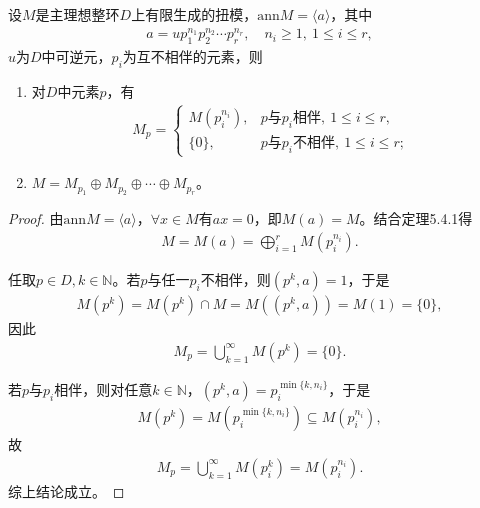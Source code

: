 \documentclass[../../main.tex]{subfiles}%
\begin{document}
\begin{theorem}
设$M$是主理想整环$D$上有限生成的扭模，$\mathrm{ann}M=\langle a\rangle$，其中
\begin{align*}
a=up_1^{n_1}p_2^{n_2}\cdots p_r^{n_r},\quad n_i\geqslant1,\ 1\leqslant i\leqslant r,
\end{align*}
$u$为$D$中可逆元，$p_i$为互不相伴的元素，则
\begin{enumerate}[(1)]
\item 对$D$中元素$p$，有
\begin{align*}
M_p=
\begin{cases}
M(p_i^{n_i}),& p\text{与}p_i\text{相伴},\ 1\leqslant i\leqslant r,\\
\{0\},& p\text{与}p_i\text{不相伴},\ 1\leqslant i\leqslant r;
\end{cases}
\end{align*}
\item $M=M_{p_1}\oplus M_{p_2}\oplus\cdots\oplus M_{p_r}$。
\end{enumerate}
\end{theorem}
\begin{proof}
由$\mathrm{ann}M=\langle a\rangle$，$\forall x\in M$有$ax=0$，即$M(a)=M$。结合定理5.4.1得
\begin{align*}
M=M(a)=\bigoplus\limits_{i=1}^{r}M(p_i^{n_i}).
\end{align*}

任取$p\in D,k\in\mathbb{N}$。若$p$与任一$p_i$不相伴，则$(p^k,a)=1$，于是
\begin{align*}
M(p^k)=M(p^k)\cap M=M((p^k,a))=M(1)=\{0\},
\end{align*}
因此
\begin{align*}
M_p=\bigcup\limits_{k=1}^{\infty}M(p^k)=\{0\}.
\end{align*}

若$p$与$p_i$相伴，则对任意$k\in\mathbb{N}$，$(p^k,a)=p_i^{\min\{k,n_i\}}$，于是
\begin{align*}
M(p^k)=M(p_i^{\min\{k,n_i\}})\subseteq M(p_i^{n_i}),
\end{align*}
故
\begin{align*}
M_p=\bigcup\limits_{k=1}^{\infty}M(p_i^k)=M(p_i^{n_i}).
\end{align*}
综上结论成立。
\end{proof}
\end{document}
